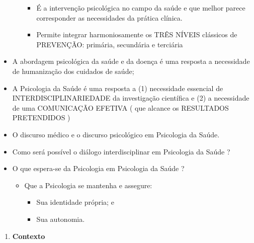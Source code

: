 \documentclass[
]{book}
\providecommand{\tightlist}{%
  \setlength{\itemsep}{0pt}\setlength{\parskip}{0pt}}
\begin{document}
\begin{itemize}
\begin{itemize}
    \begin{itemize}
    \tightlist
    \item
      É a intervenção psicológica no campo da saúde e que melhor parece
      corresponder as necessidades da prática clínica.
    \item
      Permite integrar harmoniosamente os TRÊS NÍVEIS clássicos de
      PREVENÇÃO: primária, secundária e terciária
    \end{itemize}
  \end{itemize}
\item
  A abordagem psicológica da saúde e da doença é uma resposta a
  necessidade de humanização dos cuidados de saúde;
\item
  A Psicologia da Saúde é uma resposta a (1) necessidade essencial de
  INTERDISCIPLINARIEDADE da investigação científica e (2) a necessidade
  de uma COMUNICAÇÃO EFETIVA ( que alcance os RESULTADOS PRETENDIDOS )
\item
  O discurso médico e o discurso psicológico em Psicologia da Saúde.
\item
  Como será possível o diálogo interdisciplinar em Psicologia da Saúde ?
\item
  O que espera-se da Psicologia em Psicologia da Saúde ?

  \begin{itemize}
  \tightlist
  \item
    Que a Psicologia se mantenha e assegure:

    \begin{itemize}
    \tightlist
    \item
      Sua identidade própria; e
    \item
      Sua autonomia.
    \end{itemize}
  \end{itemize}
\end{itemize}

\begin{enumerate}
\def\labelenumi{\arabic{enumi}.}
\setcounter{enumi}{1}
\tightlist
\item
  \textbf{Contexto}
\end{enumerate}
\end{document}
